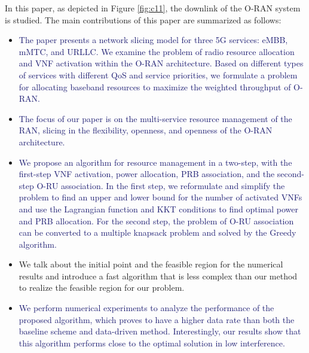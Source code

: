 \documentclass[lettersize,journal]{IEEEtran}
\begin{document}
In this paper, as depicted in Figure \ref{fig:c11}, the downlink of the O-RAN system is studied. The main contributions of this paper are summarized as follows:
\begin{itemize}
\item \textcolor{MidnightBlue}{The paper presents a network slicing model for three 5G services: eMBB, mMTC, and URLLC. We examine the problem of radio resource allocation and VNF activation within the O-RAN architecture.
Based on different types of services with different QoS and service priorities, we formulate a problem for allocating baseband resources to maximize the weighted throughput of O-RAN.}

\item \textcolor{MidnightBlue}{The focus of our paper is on the multi-service resource management of the RAN, slicing in the flexibility, openness, and openness of the O-RAN architecture.}
\item \textcolor{MidnightBlue}{We propose an algorithm for resource management in a two-step, with the first-step VNF activation, power allocation, PRB association, and the second-step O-RU association.
In the first step, we reformulate and simplify the problem to find an upper and lower bound for the number of activated VNFs and use the Lagrangian function and KKT conditions to find optimal power and PRB allocation. For the second step, the problem of O-RU association can be converted to a multiple knapsack problem and solved by the Greedy algorithm.}
\item We talk about the initial point and the feasible region for the numerical results and introduce a fast algorithm that is less complex than our method to realize the feasible region for our problem.
\item \textcolor{MidnightBlue}{We perform numerical experiments to analyze the performance of the proposed algorithm, which proves to have a higher data rate than both the baseline scheme and data-driven method. Interestingly, our results show that this algorithm performs close to the optimal solution in low interference.}
\end{itemize}
\end{document}
